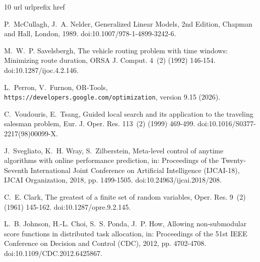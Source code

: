 \documentclass[a4paper,10pt]{article}
\begin{document}
\begin{thebibliography}{10}
\expandafter\ifx\csname url\endcsname\relax
  \def\url#1{\texttt{#1}}\fi
\expandafter\ifx\csname urlprefix\endcsname\relax\def\urlprefix{URL }\fi
\expandafter\ifx\csname href\endcsname\relax
  \def\href#1#2{#2} \def\path#1{#1}\fi

P.~McCullagh, J.~A. Nelder, Generalized Linear Models, 2nd Edition, Chapman and
  Hall, London, 1989.
\newblock \href {https://doi.org/10.1007/978-1-4899-3242-6}
  {\path{doi:10.1007/978-1-4899-3242-6}}.

M.~W.~P. Savelsbergh, The vehicle routing problem with time windows: Minimizing
  route duration, ORSA J. Comput. 4~(2) (1992) 146-154.
\newblock \href {https://doi.org/10.1287/ijoc.4.2.146}
  {\path{doi:10.1287/ijoc.4.2.146}}.

L.~Perron, V.~Furnon, {OR-Tools},
  \url{https://developers.google.com/optimization}, version 9.15 (2026).

C.~Voudouris, E.~Tsang, Guided local search and its application to the
  traveling salesman problem, Eur. J. Oper. Res. 113~(2) (1999) 469-499.
\newblock \href {https://doi.org/10.1016/S0377-2217(98)00099-X}
  {\path{doi:10.1016/S0377-2217(98)00099-X}}.

J.~Svegliato, K.~H. Wray, S.~Zilberstein, Meta-level control of anytime
  algorithms with online performance prediction, in: Proceedings of the
  Twenty-Seventh International Joint Conference on Artificial Intelligence
  (IJCAI-18), IJCAI Organization, 2018, pp. 1499-1505.
\newblock \href {https://doi.org/10.24963/ijcai.2018/208}
  {\path{doi:10.24963/ijcai.2018/208}}.

C.~E. Clark, The greatest of a finite set of random variables, Oper. Res. 9~(2)
  (1961) 145-162.
\newblock \href {https://doi.org/10.1287/opre.9.2.145}
  {\path{doi:10.1287/opre.9.2.145}}.

L.~B. Johnson, H.-L. Choi, S.~S. Ponda, J.~P. How, Allowing non-submodular
  score functions in distributed task allocation, in: Proceedings of the 51st
  IEEE Conference on Decision and Control (CDC), 2012, pp. 4702-4708.
\newblock \href {https://doi.org/10.1109/CDC.2012.6425867}
  {\path{doi:10.1109/CDC.2012.6425867}}.


\end{thebibliography}
\end{document}
